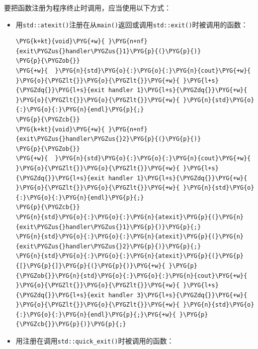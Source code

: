 
要把函数注册为程序终止时调用，应当使用以下方式：



\begin{itemize}
\item 用\texttt{std::\allowbreak{}atexit()}注册在从\texttt{main()}返回或调用\texttt{std::\allowbreak{}exit()}时被调用的函数：



\begin{codeblockbg}
\begin{Verbatim}[commandchars=\\\{\},breaklines=true,breakanywhere=true,fontsize=\codefont,xleftmargin=17bp]
\PYG{k+kt}{void}\PYG{+w}{ }\PYG{n+nf}{exit\PYGZus{}handler\PYGZus{}1}\PYG{p}{(}\PYG{p}{)}
\PYG{p}{\PYGZob{}}
\PYG{+w}{  }\PYG{n}{std}\PYG{o}{:}\PYG{o}{:}\PYG{n}{cout}\PYG{+w}{ }\PYG{o}{\PYGZlt{}}\PYG{o}{\PYGZlt{}}\PYG{+w}{ }\PYG{l+s}{\PYGZdq{}}\PYG{l+s}{exit handler 1}\PYG{l+s}{\PYGZdq{}}\PYG{+w}{ }\PYG{o}{\PYGZlt{}}\PYG{o}{\PYGZlt{}}\PYG{+w}{ }\PYG{n}{std}\PYG{o}{:}\PYG{o}{:}\PYG{n}{endl}\PYG{p}{;}
\PYG{p}{\PYGZcb{}}
\PYG{k+kt}{void}\PYG{+w}{ }\PYG{n+nf}{exit\PYGZus{}handler\PYGZus{}2}\PYG{p}{(}\PYG{p}{)}
\PYG{p}{\PYGZob{}}
\PYG{+w}{  }\PYG{n}{std}\PYG{o}{:}\PYG{o}{:}\PYG{n}{cout}\PYG{+w}{ }\PYG{o}{\PYGZlt{}}\PYG{o}{\PYGZlt{}}\PYG{+w}{ }\PYG{l+s}{\PYGZdq{}}\PYG{l+s}{exit handler 1}\PYG{l+s}{\PYGZdq{}}\PYG{+w}{ }\PYG{o}{\PYGZlt{}}\PYG{o}{\PYGZlt{}}\PYG{+w}{ }\PYG{n}{std}\PYG{o}{:}\PYG{o}{:}\PYG{n}{endl}\PYG{p}{;}
\PYG{p}{\PYGZcb{}}
\PYG{n}{std}\PYG{o}{:}\PYG{o}{:}\PYG{n}{atexit}\PYG{p}{(}\PYG{n}{exit\PYGZus{}handler\PYGZus{}1}\PYG{p}{)}\PYG{p}{;}
\PYG{n}{std}\PYG{o}{:}\PYG{o}{:}\PYG{n}{atexit}\PYG{p}{(}\PYG{n}{exit\PYGZus{}handler\PYGZus{}2}\PYG{p}{)}\PYG{p}{;}
\PYG{n}{std}\PYG{o}{:}\PYG{o}{:}\PYG{n}{atexit}\PYG{p}{(}\PYG{p}{[}\PYG{p}{]}\PYG{p}{(}\PYG{p}{)}\PYG{+w}{ }\PYG{p}{\PYGZob{}}\PYG{n}{std}\PYG{o}{:}\PYG{o}{:}\PYG{n}{cout}\PYG{+w}{ }\PYG{o}{\PYGZlt{}}\PYG{o}{\PYGZlt{}}\PYG{+w}{ }\PYG{l+s}{\PYGZdq{}}\PYG{l+s}{exit handler 3}\PYG{l+s}{\PYGZdq{}}\PYG{+w}{ }\PYG{o}{\PYGZlt{}}\PYG{o}{\PYGZlt{}}\PYG{+w}{ }\PYG{n}{std}\PYG{o}{:}\PYG{o}{:}\PYG{n}{endl}\PYG{p}{;}\PYG{+w}{ }\PYG{p}{\PYGZcb{}}\PYG{p}{)}\PYG{p}{;}
\end{Verbatim}
\end{codeblockbg}



\item 用注册在调用\texttt{std::\allowbreak{}quick\_\allowbreak{}exit()}时被调用的函数：



\end{itemize}
